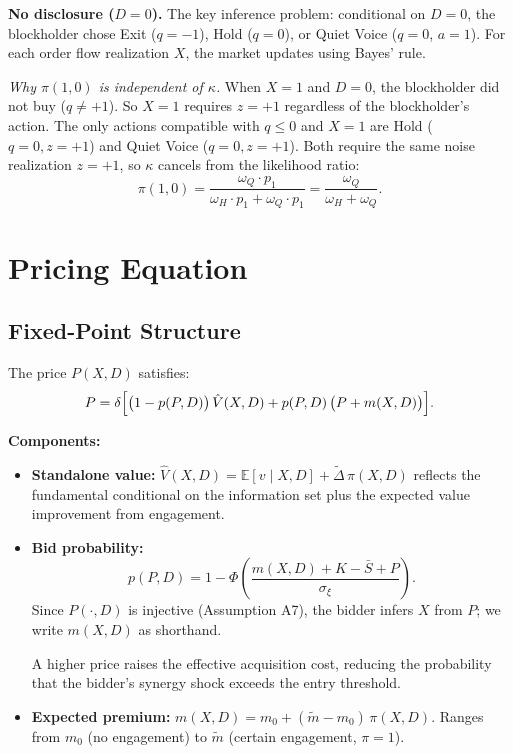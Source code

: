 \documentclass[11pt,a4paper]{article}
\newcommand{\E}{\mathbb{E}}
\newcommand{\1}{\mathbf{1}}
\begin{document}
\textbf{No disclosure ($D=0$).}
The key inference problem: conditional on $D=0$, the blockholder
chose Exit ($q=-1$), Hold ($q=0$), or Quiet Voice ($q=0$, $a=1$).
For each order flow realization $X$, the market updates using Bayes' rule.

\textit{Why $\pi(1, 0)$ is independent of $\kappa$.}
When $X = 1$ and $D = 0$, the blockholder did not buy ($q \neq +1$).
So $X = 1$ requires $z = +1$ regardless of the blockholder's action.
The only actions compatible with $q \leq 0$ and $X = 1$ are Hold
($q=0, z=+1$) and Quiet Voice ($q=0, z=+1$). Both require the same
noise realization $z=+1$, so $\kappa$ cancels from the likelihood ratio:
\[
\pi(1,0) = \frac{\omega_Q \cdot p_1}{\omega_H \cdot p_1 + \omega_Q \cdot p_1}
  = \frac{\omega_Q}{\omega_H + \omega_Q}.
\]


\section{Pricing Equation}

\subsection{Fixed-Point Structure}

The price $P(X,D)$ satisfies:
\begin{equation}\label{eq:price-fp}
P = \delta \Bigl[
  \bigl(1 - p(P,D)\bigr)\,\hat{V}(X,D)
  + p(P,D)\,\bigl(P + m(X,D)\bigr)
\Bigr].
\end{equation}

\textbf{Components:}
\begin{itemize}
\item \textbf{Standalone value:}
  $\hat{V}(X,D) = \E[v \mid X, D] + \tilde{\Delta}\, \pi(X,D)$
  reflects the fundamental conditional on the information set plus the
  expected value improvement from engagement.

\item \textbf{Bid probability:}
  \begin{equation}\label{eq:bid-prob}
    p(P, D) = 1 - \Phi\!\left(
      \frac{m(X,D) + K - \bar{S} + P}{\sigma_\xi}
    \right).
  \end{equation}
  Since $P(\cdot,D)$ is injective (Assumption A7), the bidder infers $X$ from $P$; we write $m(X,D)$ as shorthand.

  A higher price raises the effective acquisition cost,
  reducing the probability that the bidder's synergy shock exceeds
  the entry threshold.

\item \textbf{Expected premium:}
  $m(X,D) = m_0 + (\tilde{m} - m_0)\,\pi(X,D)$.
  Ranges from $m_0$ (no engagement) to $\tilde{m}$ (certain engagement, $\pi=1$).
\end{itemize}
\end{document}
